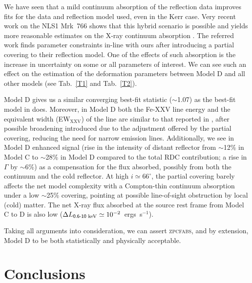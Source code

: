 \documentclass[aps,prd,twocolumn,superscriptaddress,nofootinbib,amsmath,amssymb]{revtex4-1}
\begin{document}
We have seen that a mild continuum absorption of the reflection data improves fits for the data and reflection model used, even in the Kerr case. Very recent work on the NLS1 Mrk~766 shows that this hybrid scenario is possible and yields more reasonable estimates on the X-ray continuum absorption \citep{Buisson2018}. The referred work finds parameter constraints in-line with ours after introducing a partial covering to their reflection model. One of the effects of such absorption is the increase in uncertainty on some or all parameters of interest. We can see such an effect on the estimation of the deformation parameters between Model D and all other models (see Tab.~\ref{T1} and Tab.~\ref{T2}). 

Model D gives us a similar converging best-fit statistic ($\sim$1.07) as the best-fit model in \cite{W13} does. Moreover, in Model D both the Fe-\textrm{XXV} line energy and the equivalent width (EW$_{\textrm{XXV}}$) of the line are similar to that reported in \cite{W13}, after possible broadening introduced due to the adjustment offered by the partial covering, reducing the need for narrow emission lines. Additionally, we see in Model D enhanced signal (rise in the intensity of distant reflector from $\sim$12\% in Model C to $\sim$28\% in Model D compared to the total RDC contribution; a rise in $\Gamma$ by $\sim$6\%) as a compensation for the flux absorbed, possibly from both the continuum and the cold reflector. At high $i\simeq66^\circ$, the partial covering barely affects the net model complexity with a Compton-thin continuum absorption under a low $\sim$25\% covering, pointing at possible line-of-sight obstruction by local (cold) matter. The net X-ray flux absorbed at the source rest frame from Model C to D is also low ($\Delta L_{\textsf{0.6-10~\textrm{keV}}}\simeq10^{-2}$~ergs~s$^{-1}$).

Taking all arguments into consideration, we can assert \textsc{zpcfabs},  and by extension, Model D to be both statistically and physically acceptable. 





\section{\label{conc}Conclusions}
\end{document}
